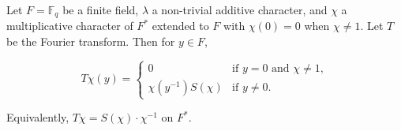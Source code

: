 Let $F = \mathbb{F}_q$ be a finite field, $\lambda$ a non-trivial additive character, and $\chi$ a multiplicative character of $F^*$ extended to $F$ with $\chi(0) = 0$ when $\chi \neq 1$. Let $T$ be the Fourier transform. Then for $y \in F$,

$$T\chi(y) = \begin{cases} 0 & \text{if } y = 0 \text{ and } \chi \neq 1, \\ \chi(y^{-1}) S(\chi) & \text{if } y \neq 0. \end{cases}$$

Equivalently, $T\chi = S(\chi) \cdot \chi^{-1}$ on $F^*$.
